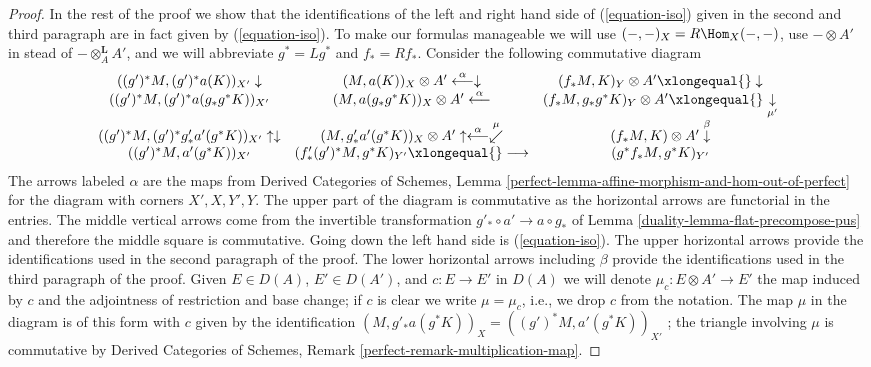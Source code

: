 \begin{proof}
\medskip\noindent
In the rest of the proof we show that the identifications of
the left and right hand side of (\ref{equation-iso})
given in the second and third paragraph are in fact given by
(\ref{equation-iso}). To make our formulas manageable
we will use $(-, -)_X = R\Hom_X(-, -)$, use $- \otimes A'$
in stead of $- \otimes_A^\mathbf{L} A'$, and we will abbreviate
$g^* = Lg^*$ and $f_* = Rf_*$. Consider the following
commutative diagram
$$
\begin{array}{ccc}((g')^*M, (g')^*a(K))_{X'} \downarrow & (M, a(K))_X \otimes A' \overset{\alpha}{\longleftarrow}\downarrow & (f_*M, K)_Y \otimes A' \xlongequal{}\downarrow \\ ((g')^*M, (g')^*a(g_*g^*K))_{X'} & (M, a(g_*g^*K))_X \otimes A' \overset{\alpha}{\longleftarrow} & (f_*M, g_*g^*K)_Y \otimes A' \xlongequal{}\underset{\mu'}{\downarrow} \\ ((g')^*M, (g')^*g'_*a'(g^*K))_{X'} \uparrow\downarrow & (M, g'_*a'(g^*K))_X \otimes A' \uparrow\overset{\alpha}{\longleftarrow}\overset{\mu}{\swarrow} & (f_*M, K) \otimes A' \overset{\beta}{\downarrow} \\ ((g')^*M, a'(g^*K))_{X'} & (f'_*(g')^*M, g^*K)_{Y'} \xlongequal{}\longrightarrow & (g^*f_*M, g^*K)_{Y'}\end{array}
$$
The arrows labeled $\alpha$ are the maps from
Derived Categories of Schemes, Lemma
\ref{perfect-lemma-affine-morphism-and-hom-out-of-perfect}
for the diagram with corners $X', X, Y', Y$.
The upper part of the diagram is commutative as the horizontal arrows are
functorial in the entries.
The middle vertical arrows come from the invertible transformation
$g'_* \circ a' \to a \circ g_*$  of Lemma \ref{duality-lemma-flat-precompose-pus}
and therefore the middle square is commutative.
Going down the left hand side is (\ref{equation-iso}).
The upper horizontal arrows provide the identifications used in the
second paragraph of the proof.
The lower horizontal arrows including $\beta$ provide the identifications
used in the third paragraph of the proof. Given $E \in D(A)$,
$E' \in D(A')$, and $c : E \to E'$ in $D(A)$ we will denote
$\mu_c : E \otimes A' \to E'$ the map induced by $c$
and the adjointness of restriction and base change;
if $c$ is clear we write $\mu = \mu_c$, i.e., we
drop $c$ from the notation. The map $\mu$ in the diagram is of this
form with $c$ given by the identification
$(M, g'_*a(g^*K))_X = ((g')^*M, a'(g^*K))_{X'}$
; the triangle involving $\mu$ is commutative by
Derived Categories of Schemes, Remark \ref{perfect-remark-multiplication-map}.


\end{proof}
